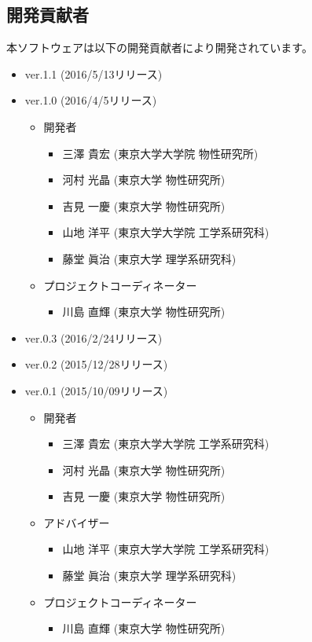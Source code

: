 \subsection{開発貢献者}
\label{subsec:developers}
本ソフトウェアは以下の開発貢献者により開発されています。
\begin{itemize}
\item{ver.1.1 (2016/5/13リリース)}
\item{ver.1.0 (2016/4/5リリース)}
\begin{itemize}
\item{開発者}
	\begin{itemize}
	\item{三澤 貴宏 (東京大学大学院 物性研究所)}
	\item{河村 光晶 (東京大学 物性研究所)}
	\item{吉見 一慶 (東京大学 物性研究所)}
	\item{山地 洋平 (東京大学大学院 工学系研究科)}
	\item{藤堂 眞治 (東京大学 理学系研究科)}
	\end{itemize}
\item{プロジェクトコーディネーター}
	\begin{itemize}
	\item{川島 直輝 (東京大学 物性研究所)}
	\end{itemize}

\end{itemize}

\item{ver.0.3 (2016/2/24リリース)}
\item{ver.0.2 (2015/12/28リリース)}
\item{ver.0.1 (2015/10/09リリース)}
\begin{itemize}
\item{開発者}
	\begin{itemize}
	\item{三澤 貴宏 (東京大学大学院 工学系研究科)}
	\item{河村 光晶 (東京大学 物性研究所)}
	\item{吉見 一慶 (東京大学 物性研究所)}
	\end{itemize}
\item{アドバイザー}
	\begin{itemize}
	\item{山地 洋平 (東京大学大学院 工学系研究科)}
	\item{藤堂 眞治 (東京大学 理学系研究科)}
	\end{itemize}
\item{プロジェクトコーディネーター}
	\begin{itemize}
	\item{川島 直輝 (東京大学 物性研究所)}
	\end{itemize}

\end{itemize}
\end{itemize}


